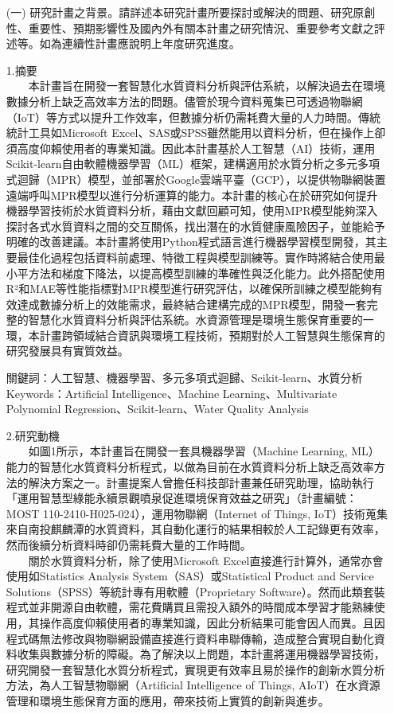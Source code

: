 \documentclass[12pt,a4paper]{article}
\begin{document}

\begin{enumerate}
\item[(一)] 研究計畫之背景。請詳述本研究計畫所要探討或解決的問題、研究原創性、重要性、預期影響性及國內外有關本計畫之研究情況、重要參考文獻之評述等。如為連續性計畫應說明上年度研究進度。
\item[] 1.摘要\\
　　本計畫旨在開發一套智慧化水質資料分析與評估系統，以解決過去在環境數據分析上缺乏高效率方法的問題。儘管於現今資料蒐集已可透過物聯網（IoT）等方式以提升工作效率，但數據分析仍需耗費大量的人力時間。傳統統計工具如Microsoft Excel、SAS或SPSS雖然能用以資料分析，但在操作上卻須高度仰賴使用者的專業知識。因此本計畫基於人工智慧（AI）技術，運用Scikit-learn自由軟體機器學習（ML）框架，建構適用於水質分析之多元多項式迴歸（MPR）模型，並部署於Google雲端平臺（GCP），以提供物聯網裝置遠端呼叫MPR模型以進行分析運算的能力。本計畫的核心在於研究如何提升機器學習技術於水質資料分析，藉由文獻回顧可知，使用MPR模型能夠深入探討各式水質資料之間的交互關係，找出潛在的水質健康風險因子，並能給予明確的改善建議。本計畫將使用Python程式語言進行機器學習模型開發，其主要最佳化過程包括資料前處理、特徵工程與模型訓練等。實作時將結合使用最小平方法和梯度下降法，以提高模型訓練的準確性與泛化能力。此外搭配使用R²和MAE等性能指標對MPR模型進行研究評估，以確保所訓練之模型能夠有效達成數據分析上的效能需求，最終結合建構完成的MPR模型，開發一套完整的智慧化水質資料分析與評估系統。水資源管理是環境生態保育重要的一環，本計畫跨領域結合資訊與環境工程技術，預期對於人工智慧與生態保育的研究發展具有實質效益。
\item[] 關鍵詞：人工智慧、機器學習、多元多項式迴歸、Scikit-learn、水質分析\\
Keywords：Artificial Intelligence、Machine Learning、Multivariate Polynomial Regression、Scikit-learn、Water Quality Analysis
\item[] 2.研究動機\\
　　如圖1所示，本計畫旨在開發一套具機器學習（Machine Learning, ML）能力的智慧化水質資料分析程式，以做為目前在水質資料分析上缺乏高效率方法的解決方案之一。計畫提案人曾擔任科技部計畫兼任研究助理，協助執行「運用智慧型綠能永續景觀噴泉促進環境保育效益之研究」（計畫編號：MOST 110-2410-H025-024），運用物聯網（Internet of Things, IoT）技術蒐集來自南投麒麟潭的水質資料，其自動化運行的結果相較於人工記錄更有效率，然而後續分析資料時卻仍需耗費大量的工作時間。\\
　　關於水質資料分析，除了使用Microsoft Excel直接進行計算外，通常亦會使用如Statistics Analysis System（SAS）或Statistical Product and Service Solutions（SPSS）等統計專有用軟體（Proprietary Software）。然而此類套裝程式並非開源自由軟體，需花費購買且需投入額外的時間成本學習才能熟練使用，其操作高度仰賴使用者的專業知識，因此分析結果可能會因人而異。且因程式碼無法修改與物聯網設備直接進行資料串聯傳輸，造成整合實現自動化資料收集與數據分析的障礙。為了解決以上問題，本計畫將運用機器學習技術，研究開發一套智慧化水質分析程式，實現更有效率且易於操作的創新水質分析方法，為人工智慧物聯網（Artificial Intelligence of Things, AIoT）在水資源管理和環境生態保育方面的應用，帶來技術上實質的創新與進步。\\

\end{enumerate}
\end{document}

